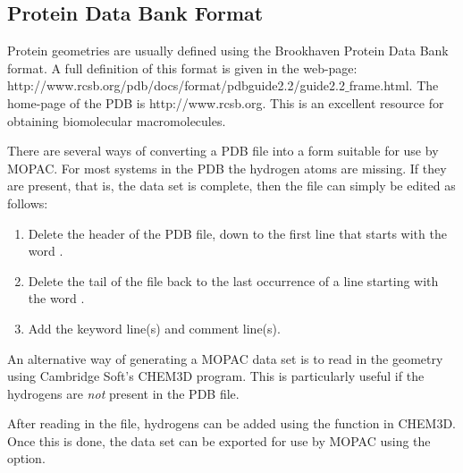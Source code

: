\subsection{Protein Data Bank Format}
Protein geometries are usually defined using the Brookhaven Protein Data Bank
format.  A full definition of this format is given in the web-page: \\
http://www.rcsb.org/pdb/docs/format/pdbguide2.2/guide2.2$\_$frame.html.
The home-page of the PDB is http://www.rcsb.org. This is an excellent
 resource for obtaining biomolecular macromolecules.

There are several ways of converting a PDB file into a form suitable for use by
MOPAC.   For most systems in the PDB the hydrogen atoms are missing.  If they
are present, that is, the data set is complete, then the file can simply be
edited as follows:
\begin{enumerate}
\item Delete the header of the PDB file, down to the first line that starts with
the word .
\item Delete the tail of the file back to the last occurrence of a line starting
with the word .
\item Add the keyword line(s) and comment line(s).
\end{enumerate}

An alternative way of generating a MOPAC data set is to read in the geometry
using Cambridge Soft's CHEM3D program.  This is particularly useful if the
hydrogens are {\em not} present in the PDB file.

After reading in the file, hydrogens can be added using the 
function in CHEM3D.  Once this is done, the data set can be exported for
use by MOPAC using the  option.

